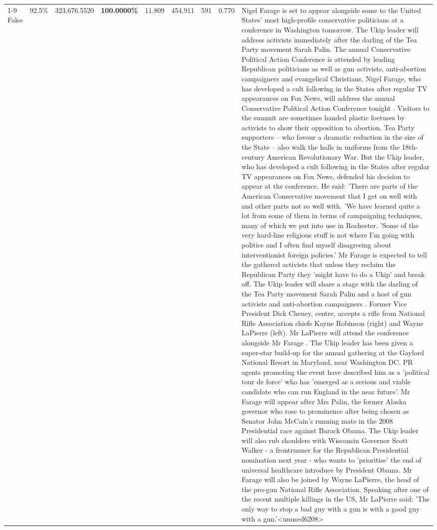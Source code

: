 \begin{table}[H]
\begin{tabular}{lllrlllll}
\cline{1-9}
False & 92.5\% & 323,676.5520 & \bfseries \color{red} 100.0000\% & 11.809 & 454.911 & 591 & 0.770 & Nigel Farage is set to appear alongside some to the United States' most high-profile conservative politicians at a conference in Washington tomorrow. The Ukip leader will address activists immediately after the darling of the Tea Party movement Sarah Palin. The annual Conservative Political Action Conference is attended by leading Republican politicians as well as gun activists, anti-abortion campaigners and evangelical Christians. Nigel Farage, who has developed a cult following in the States after regular TV appearances on Fox News, will address the annual Conservative Political Action Conference tonight . Visitors to the summit are sometimes handed plastic foetuses by activists to show their opposition to abortion. Tea Party supporters – who favour a dramatic reduction in the size of the State – also walk the halls in uniforms from the 18th-century American Revolutionary War. But the Ukip leader, who has developed a cult following in the States after regular TV appearances on Fox News, defended his decision to appear at the conference. He said: 'There are parts of the American Conservative movement that I get on well with and other parts not so well with. 'We have learned quite a lot from some of them in terms of campaigning techniques, many of which we put into use in Rochester. 'Some of the very hard-line religious stuff is not where I'm going with politics and I often find myself disagreeing about interventionist foreign policies.' Mr Farage is expected to tell the gathered activists that unless they reclaim the Republican Party they 'might have to do a Ukip' and break off. The Ukip leader will share a stage with the darling of the Tea Party movement Sarah Palin and a host of gun activists and anti-abortion campaigners . Former Vice President Dick Cheney, centre, accepts a rifle from National Rifle Association chiefs Kayne Robinson (right) and Wayne LaPierre (left). Mr LaPierre will attend the conference alongside Mr Farage . The Ukip leader has been given a super-star build-up for the annual gathering at the Gaylord National Resort in Maryland, near Washington DC. PR agents promoting the event have described him as a 'political tour de force' who has 'emerged as a serious and viable candidate who can run England in the near future'. Mr Farage will appear after Mrs Palin, the former Alaska governor who rose to prominence after being chosen as Senator John McCain's running mate in the 2008 Presidential race against Barack Obama. The Ukip leader will also rub shoulders with Wisconsin Governor Scott Walker - a frontrunner for the Republican Presidential nomination next year - who wants to 'prioritise' the end of universal healthcare introduce by President Obama. Mr Farage will also be joined by Wayne LaPierre, the head of the pro-gun National Rifle Association. Speaking after one of the recent multiple killings in the US, Mr LaPierre said: 'The only way to stop a bad guy with a gun is with a good guy with a gun.'<unused6208> \\

\end{tabular}
\end{table}
